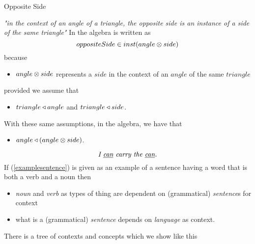 \begin{frame}{Opposite Side}
\iffalse
{\begin{displaymath}
\begin{array}{c p{0.5cm} c  c} 
                &&\rnode{Bp}{} &                   \\
\rnode{A}{}&                   &                   \\[0.25cm]
                &&             & \rnode{Cp}{} \\
\end{array}
\ncline[nodesep=0pt]{A}{Bp}
\ncput{\rnode{B}{}}
\ncline[nodesep=0pt]{A}{Cp}
\ncput{\rnode{C}{}}
\ncline[nodesep=0pt]{Bp}{Cp}
\ncline[nodesep=0pt]{B}{C}
\nput[labelsep=1pt]{180}{A}{A}
\nput[labelsep=2pt]{80}{Bp}{B'}
\nput[labelsep=1pt]{290}{Cp}{C'}
\nput[labelsep=1pt]{120}{B}{B}
\nput[labelsep=2pt]{260}{C}{C}
\end{displaymath}
}
\fi

\textit{"in the context of an angle of a triangle, the opposite side is an instance of a side of the same triangle"}
\medskip
In the algebra is written as
$$oppositeSide \in inst(angle \otimes side)$$
because
\begin{itemize}
\item $angle \otimes side$ represents a $side$ in the context of an $angle$ of the same $triangle$
\end{itemize}
provided we assume that
\begin{itemize}
\item $triangle \triangleleft angle$ and $triangle \triangleleft side$.
\end{itemize}
With these same assumptions, in the algebra, we have that
\begin{itemize}
\item $angle \triangleleft (angle \otimes side)$.
\end{itemize}
\end{frame}


\begin{frame}
\begin{equation}
\label{examplesentence}
\mbox{\textit{I \underline{can} carry the \underline{can}.}}
\end{equation}
If (\ref{examplesentence}) is given as an example of a sentence having a word that is both a verb and a noun then
\medskip
\begin{itemize}
\item \textit{noun} and \textit{verb} as types of thing are dependent on (grammatical) \textit{sentence}s for context
\item what is a (grammatical) \textit{sentence} depends on \textit{language} as context.
\end{itemize}
There is a tree of contexts and concepts which we show like this

\end{frame}
